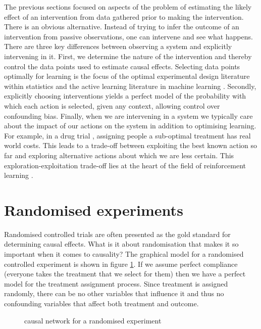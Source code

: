 \documentclass[11pt,a4paper,twoside]{report}
\theoremstyle{plain}
\theoremstyle{definition}
\begin{document}
The previous sections focused on aspects of the problem of estimating the likely effect of an intervention from data gathered prior to making the intervention. There is an obvious alternative. Instead of trying to infer the outcome of an intervention from passive observations, one can intervene and see what happens. There are three key differences between observing a system and explicitly intervening in it. First, we determine the nature of the intervention and thereby control the data points used to estimate causal effects. Selecting data points optimally for learning is the focus of the optimal experimental design literature within statistics \citep{pukelsheim2006optimal} and the active learning literature in machine learning \citep{settles2010active}. Secondly, explicitly choosing interventions yields a perfect model of the probability with which each action is selected, given any context, allowing control over confounding bias. Finally, when we are intervening in a system we typically care about the impact of our actions on the system in addition to optimising learning. For example, in a drug trial , assigning people a sub-optimal treatment has real world costs. This leads to a trade-off between exploiting the best known action so far and exploring alternative actions about which we are less certain. This exploration-exploitation trade-off lies at the heart of the field of reinforcement learning \citep{sutton1998reinforcement}. 

\section{Randomised experiments}
\label{sec:randomized_experiment}
Randomised controlled trials are often presented as the gold standard for determining causal effects. What is it about randomisation that makes it so important when it comes to causality? The graphical model for a randomised controlled experiment is shown in figure \ref{fig:random_experiment_network}. If we assume perfect compliance (everyone takes the treatment that we select for them) then we have a perfect model for the treatment assignment process. Since treatment is assigned randomly, there can be no other variables that influence it and thus no confounding variables that affect both treatment and outcome. 

\begin{figure}
\centering
{}
\caption{causal network for a randomised experiment}
\label{fig:random_experiment_network}
\end{figure} 
\end{document}
